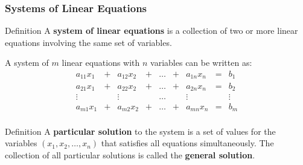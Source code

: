 \documentclass{beamer}
\begin{document}
\begin{frame}
  \frametitle{Systems of Linear Equations}

  \begin{block}{Definition}
    A \textbf{system of linear equations} is a collection of two or more linear equations involving the same set of variables.
  \end{block}

  \pause
    A system of \(m\) linear equations with \(n\) variables can be written as:
    \[
      \begin{array}{ccccccccccc}
        a_{11}x_1 & + & a_{12}x_2 & + & \ldots & + & a_{1n}x_n & = & b_1 \\
        a_{21}x_1 & + & a_{22}x_2 & + & \ldots & + & a_{2n}x_n & = & b_2 \\
        \vdots & & \vdots & & \ldots & & \vdots & & \vdots \\
        a_{m1}x_1 & + & a_{m2}x_2 & + & \ldots & + & a_{mn}x_n & = & b_m \\
      \end{array}
    \]

  \pause

  \begin{block}{Definition}
    A \textbf{particular solution} to the system is a set of values for the variables $(x_1, x_2,\dots, x_n)$ that satisfies all equations simultaneously. The collection of all particular solutions is called the \textbf{general solution}.
  \end{block}

\end{frame}
\end{document}
